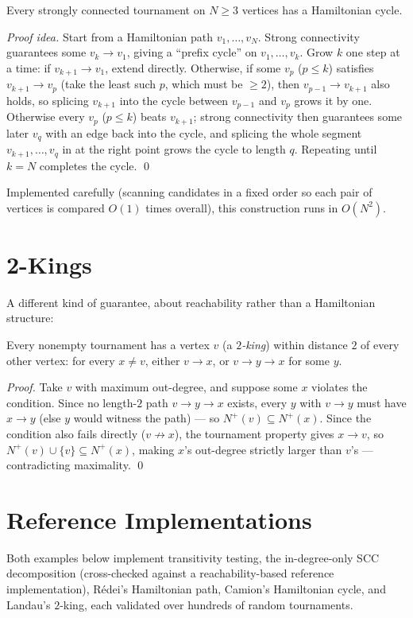 \documentclass[11pt]{article}
\begin{document}
\begin{theorembox}[(Camion)]
Every strongly connected tournament on $N \ge 3$ vertices has a
Hamiltonian cycle.

\emph{Proof idea.} Start from a Hamiltonian path $v_1, \ldots, v_N$.
Strong connectivity guarantees some $v_k \to v_1$, giving a ``prefix
cycle'' on $v_1, \ldots, v_k$. Grow $k$ one step at a time: if
$v_{k+1} \to v_1$, extend directly. Otherwise, if some $v_p$
($p \le k$) satisfies $v_{k+1} \to v_p$ (take the least such $p$, which
must be $\ge 2$), then $v_{p-1} \to v_{k+1}$ also holds, so splicing
$v_{k+1}$ into the cycle between $v_{p-1}$ and $v_p$ grows it by one.
Otherwise every $v_p$ ($p \le k$) beats $v_{k+1}$; strong connectivity
then guarantees some later $v_q$ with an edge back into the cycle, and
splicing the whole segment $v_{k+1}, \ldots, v_q$ in at the right point
grows the cycle to length $q$. Repeating until $k = N$ completes the
cycle. \qed
\end{theorembox}

Implemented carefully (scanning candidates in a fixed order so each pair
of vertices is compared $O(1)$ times overall), this construction runs in
$O(N^2)$.

\section{2-Kings}
A different kind of guarantee, about reachability rather than a
Hamiltonian structure:

\begin{theorembox}[(Landau)]
Every nonempty tournament has a vertex $v$ (a \emph{$2$-king}) within
distance $2$ of every other vertex: for every $x \ne v$, either
$v \to x$, or $v \to y \to x$ for some $y$.

\emph{Proof.} Take $v$ with maximum out-degree, and suppose some $x$
violates the condition. Since no length-$2$ path $v \to y \to x$ exists,
every $y$ with $v \to y$ must have $x \to y$ (else $y$ would witness the
path) --- so $N^+(v) \subseteq N^+(x)$. Since the condition also fails
directly ($v \not\to x$), the tournament property gives $x \to v$, so
$N^+(v) \cup \{v\} \subseteq N^+(x)$, making $x$'s out-degree strictly
larger than $v$'s --- contradicting maximality. \qed
\end{theorembox}

\section{Reference Implementations}
Both examples below implement transitivity testing, the in-degree-only
SCC decomposition (cross-checked against a reachability-based reference
implementation), R\'edei's Hamiltonian path, Camion's Hamiltonian cycle,
and Landau's $2$-king, each validated over hundreds of random tournaments.
\end{document}
